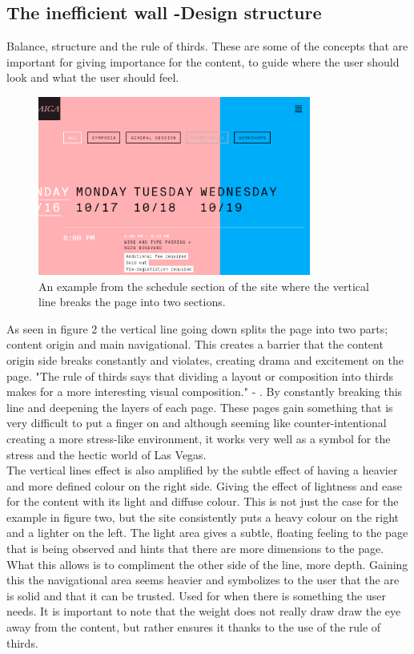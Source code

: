 \documentclass{article}
\begin{document}
        \subsection{The inefficient wall -Design structure}
        Balance, structure and the rule of thirds. These are some of the concepts that are important for giving importance for the content, to guide where the user should look and what the user should feel.
        \begin{figure}[!h]
            \centering
            \includegraphics[width=0.8\textwidth]{LineBreaker}
            \caption{An example from the schedule section of the site where the vertical line breaks the page into two sections. }
        \end{figure}
        As seen in figure 2 the vertical line going down splits the page into two parts; content origin and main navigational. This creates a barrier that the content origin side breaks constantly and violates, creating drama and excitement on the page. "The rule of thirds says that dividing a layout or composition into thirds makes for a more interesting visual composition." - \cite[Page. 252]{WSINYE}. By constantly breaking this line and deepening the layers of each page. These pages gain something that is very difficult to put a finger on and although seeming like counter-intentional creating a more stress-like environment, it works very well as a symbol for the stress and the hectic world of Las Vegas.\\ The vertical lines effect is also amplified by the subtle effect of having a heavier and more defined colour on the right side. Giving the effect of lightness and ease for the content with its light and diffuse colour. This is not just the case for the example in figure two, but the site consistently puts a heavy colour on the right and a lighter on the left. The light area gives a subtle, floating feeling to the page that is being observed and hints that there are more dimensions to the page. What this allows is to compliment the other side of the line, more depth. Gaining this the navigational area seems heavier and symbolizes to the user that the are is solid and that it can be trusted. Used for when there is something the user needs. It is important to note that the weight does not really draw draw the eye away from the content, but rather ensures it thanks to the use of the rule of thirds.\\  
\end{document}
